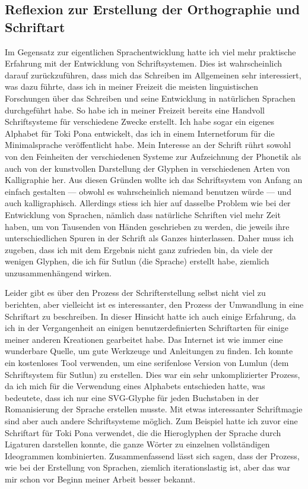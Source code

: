 \documentclass{article}
\begin{document}
\subsection{Reflexion zur Erstellung der Orthographie und Schriftart}
Im Gegensatz zur eigentlichen Sprachentwicklung hatte ich viel mehr praktische Erfahrung mit der Entwicklung
von Schriftsystemen. Dies ist wahrscheinlich darauf zurückzuführen, dass mich das Schreiben im Allgemeinen sehr
interessiert, was dazu führte, dass ich in meiner Freizeit die meisten linguistischen Forschungen über
das Schreiben und seine Entwicklung in natürlichen Sprachen durchgeführt habe.
So habe ich in meiner Freizeit bereits eine Handvoll Schriftsysteme für verschiedene Zwecke erstellt.
Ich habe sogar ein eigenes Alphabet für Toki Pona entwickelt, das ich in einem Internetforum für die
Minimalsprache veröffentlicht habe. Mein Interesse an der Schrift rührt sowohl von den Feinheiten der
verschiedenen Systeme zur Aufzeichnung der Phonetik als auch von der kunstvollen Darstellung der Glyphen
in verschiedenen Arten von Kalligraphie her. Aus diesen Gründen wollte ich das Schriftsystem von Anfang
an einfach gestalten --- obwohl es wahrscheinlich niemand benutzen würde --- und auch kalligraphisch.
Allerdings stiess ich hier auf dasselbe Problem wie bei der Entwicklung von Sprachen,
nämlich dass natürliche Schriften viel mehr Zeit haben, um von Tausenden von Händen geschrieben zu werden,
die jeweils ihre unterschiedlichen Spuren in der Schrift als Ganzes hinterlassen. Daher muss ich zugeben,
dass ich mit dem Ergebnis nicht ganz zufrieden bin, da viele der wenigen Glyphen,
die ich für Sutlun (die Sprache) erstellt habe, ziemlich unzusammenhängend wirken.

Leider gibt es über den Prozess der Schrifterstellung selbst nicht viel zu berichten,
aber vielleicht ist es interessanter, den Prozess der Umwandlung in eine Schriftart zu beschreiben.
In dieser Hinsicht hatte ich auch einige Erfahrung, da ich in der Vergangenheit an einigen
benutzerdefinierten Schriftarten für einige meiner anderen Kreationen gearbeitet habe.
Das Internet ist wie immer eine wunderbare Quelle, um gute Werkzeuge und Anleitungen zu finden.
Ich konnte ein kostenloses Tool verwenden, um eine serifenlose Version von Lumlun (dem Schriftsystem für Sutlun)
zu erstellen. Dies war ein sehr unkomplizierter Prozess, da ich mich für die Verwendung eines
Alphabets entschieden hatte, was bedeutete, dass ich nur eine SVG-Glyphe für jeden Buchstaben
in der Romanisierung der Sprache erstellen musste. Mit etwas interessanter Schriftmagie sind
aber auch andere Schriftsysteme möglich. Zum Beispiel hatte ich zuvor eine Schriftart für Toki Pona verwendet,
die die Hieroglyphen der Sprache durch Ligaturen darstellen konnte, die ganze Wörter zu einzelnen vollständigen
Ideogrammen kombinierten. Zusammenfassend lässt sich sagen, dass der Prozess, wie bei der Erstellung von Sprachen,
ziemlich iterationslastig ist, aber das war mir schon vor Beginn meiner Arbeit besser bekannt.
\end{document}
